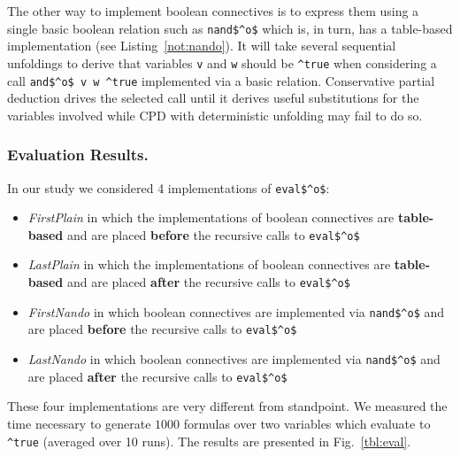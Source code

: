 The other way to implement boolean connectives is to express them using a single basic boolean relation such as \lstinline{nand$^o$} which is, in turn, has a table-based
implementation (see Listing~\ref{not:nando}). It will take several sequential unfoldings to derive that variables \lstinline{v} and \lstinline{w} should
be \lstinline{^true} when considering a call \lstinline{and$^o$ v w ^true} implemented via a basic relation.
Conservative partial deduction drives the selected call until it derives useful substitutions for the variables involved while CPD with deterministic unfolding may fail to do so.

\subsubsection{Evaluation Results.}
In our study we considered 4 implementations of \lstinline{eval$^o$}:
\begin{itemize}
  \item \emph{FirstPlain} in which the implementations of boolean connectives are \textbf{table-based} and are placed \textbf{before} the recursive calls to \lstinline{eval$^o$}
  \item \emph{LastPlain} in which the implementations of boolean connectives are \textbf{table-based} and are placed \textbf{after} the recursive calls to \lstinline{eval$^o$}
  \item \emph{FirstNando} in which boolean connectives are implemented via \lstinline{nand$^o$} and are placed \textbf{before} the recursive calls to \lstinline{eval$^o$}
  \item \emph{LastNando} in which boolean connectives are implemented via \lstinline{nand$^o$} and are placed \textbf{after} the recursive calls to \lstinline{eval$^o$}

\end{itemize}

These four implementations are very different from \ecce standpoint.
We measured the time necessary to generate $1000$ formulas over two variables which evaluate to \lstinline{^true} (averaged over 10 runs).
The results are presented in Fig.~\ref{tbl:eval}.

